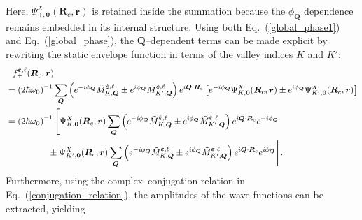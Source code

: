 Here, $\Psi^{X}_{\pm,\boldsymbol{0}}(\boldsymbol{R}_c,\boldsymbol{r})$ is retained inside the summation because the $\phi_{\boldsymbol{Q}}$ dependence remains embedded in its internal structure. Using both Eq.~(\ref{global_phase1}) and Eq.~(\ref{global_phase}), the $\boldsymbol{Q}$--dependent terms can be made explicit by rewriting the static envelope function in terms of the valley indices $K$ and $K'$:
\begin{equation}
\begin{aligned}
& \hspace{0.75em} f_{\pm}^{\hat{\boldsymbol{\varepsilon}}, \ell}(\boldsymbol{R}_c, \boldsymbol{r}) \\
&= \left( 2 \hbar \omega_{\boldsymbol{0}}\right)^{-1}
\sum_{\boldsymbol{Q}}
\left( e^{-i\phi_{\boldsymbol{Q}}} \tilde{M}^{\hat{\boldsymbol{\varepsilon}}, \ell}_{K,\boldsymbol{Q}}
\pm
e^{i\phi_{\boldsymbol{Q}}} \tilde{M}^{\hat{\boldsymbol{\varepsilon}}, \ell}_{K',\boldsymbol{Q}}  \right)
e^{i\boldsymbol{Q}\cdot\boldsymbol{R}_c}
\left[ e^{-i\phi_{\boldsymbol{Q}}} \Psi^{X}_{K,\boldsymbol{0}}(\boldsymbol{R}_c, \boldsymbol{r})
\pm 
e^{i\phi_{\boldsymbol{Q}}} \Psi^{X}_{K',\boldsymbol{0}}(\boldsymbol{R}_c, \boldsymbol{r}) \right] \\
&= \left( 2 \hbar \omega_{\boldsymbol{0}}\right)^{-1}
\Bigg[
\Psi^{X}_{K,\boldsymbol{0}}(\boldsymbol{R}_c, \boldsymbol{r})
\sum_{\boldsymbol{Q}}
\left( e^{-i\phi_{\boldsymbol{Q}}} \tilde{M}^{\hat{\boldsymbol{\varepsilon}}, \ell}_{K,\boldsymbol{Q}} 
\pm
e^{i\phi_{\boldsymbol{Q}}} \tilde{M}^{\hat{\boldsymbol{\varepsilon}}, \ell}_{K',\boldsymbol{Q}} \right)
e^{i\boldsymbol{Q}\cdot\boldsymbol{R}_c} e^{-i\phi_{\boldsymbol{Q}}} \\
& \hspace{4.8em} \pm
\Psi^{X}_{K',\boldsymbol{0}}(\boldsymbol{R}_c, \boldsymbol{r})
\sum_{\boldsymbol{Q}}
\left( e^{-i\phi_{\boldsymbol{Q}}} \tilde{M}^{\hat{\boldsymbol{\varepsilon}}, \ell}_{K,\boldsymbol{Q}} 
\pm
e^{i\phi_{\boldsymbol{Q}}} \tilde{M}^{\hat{\boldsymbol{\varepsilon}}, \ell}_{K',\boldsymbol{Q}} \right)
e^{i\boldsymbol{Q}\cdot\boldsymbol{R}_c} e^{i\phi_{\boldsymbol{Q}}}
\Bigg].
\end{aligned}
\end{equation}
Furthermore, using the complex--conjugation relation in Eq.~(\ref{conjugation_relation}), the amplitudes of the wave functions can be extracted, yielding
